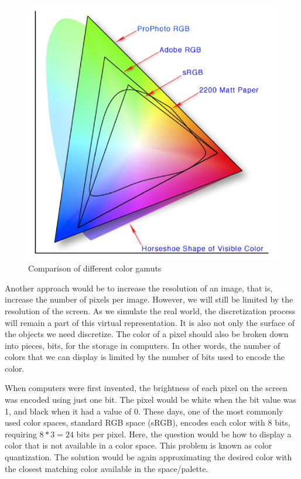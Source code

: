 \begin{figure}
\includegraphics[width=0.9\linewidth]{Images/Colorspace.png}
\caption{Comparison of different color gamuts \cite{schewe2007color}}\label{fig:color-gamut}
    
\end{figure} 

Another approach would be to increase the resolution of an image, that is, increase the number of pixels per image. However, we will still be limited by the resolution of the screen. As we simulate the real world, the discretization process will remain a part of this virtual representation. It is also not only the surface of the objects we need discretize. The color of a pixel should also be broken down into pieces, bits, for the storage in computers. In other words, the number of colors that we can display is limited by the number of bits used to encode the color. 

When computers were first invented, the brightness of each pixel on the screen was encoded using just one bit. The pixel would be white when the bit value was 1, and black when it had a value of 0. These days, one of the most commonly used color spaces, standard RGB space (sRGB), encodes each color with 8 bits, requiring $8 * 3 = 24$ bits per pixel. Here, the question would be how to display a color that is not available in a color space. This problem is known as color quantization. The solution would be again approximating the desired color with the closest matching color available in the space/palette.

